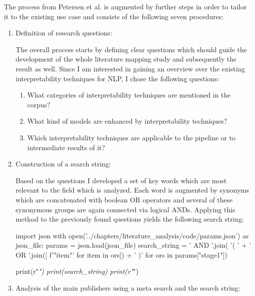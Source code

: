 The process from Petersen et al. is augmented by further steps in order to tailor it to the existing use case and consists of the following seven procedures:
\begin{enumerate}
	
	\item Definition of research questions:
	
	The overall process starts by defining clear questions which should guide the development of the whole literature mapping study and subsequently the result as well. Since I am interested in gaining an overview over the existing interpretability techniques for NLP, I chose the following questions:
	
	\begin{enumerate}
		\item What categories of interpretability techniques are mentioned in the corpus?
		\item What kind of models are enhanced by interpretability techniques?
		\item Which interpretability techniques are applicable to the pipeline or to intermediate results of it?
	\end{enumerate}
	
	\item Construction of a search string:
	
	Based on the questions I developed a set of key words which are most relevant to the field which is analyzed. Each word is augmented by synonyms which are concatenated with boolean OR operators and several of these synonymous groups are again connected via logical ANDs. Applying this method to the previously found questions yields the following search string:
	
\begin{pycode}
import json
with open('../chapters/literature_analysis/code/params.json') as json_file:
	params = json.load(json_file)
	search_string = ' AND '.join( '( ' + ' OR '.join([ f'"{item}"' for item in ors]) + ' )' for ors in params["stage1"])
	
	print(r"\textit{")
	print(search_string)
	print(r"}")
\end{pycode}
	
	
	\item Analysis of the main publishers using a meta search and the search string:
	

\end{enumerate}
